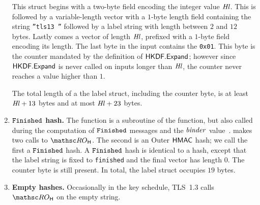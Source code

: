 \begin{enumerate}
	This struct begins with a two-byte field encoding the integer value $\mathit{Hl}$.
	This is followed by a variable-length vector with a $1$-byte length field containing the string \texttt{''tls13 ''} followed by a label string with length between $2$ and $12$ bytes. 
	Lastly comes a vector of length $\mathit{Hl}$, prefixed with a $1$-byte field encoding its length. 
	The last byte in the input contains the \texttt{0x01}. 
	This byte is the counter mandated by the definition of $\mathsf{HKDF.Expand}$; however since $\mathsf{HKDF.Expand}$ is never called on inputs longer than $\mathit{Hl}$, the counter never reaches a value higher than $1$.
	
	The total length of a the label struct, including the counter byte, is at least $\mathit{Hl}+13$ bytes and at most $\mathit{Hl}+23$ bytes. 
	
	\item \textbf{$\mathtt{Finished}$ hash.} The  function is a subroutine of the  function, but also called during the computation of $\mathtt{Finished}$ messages and the $\mathit{binder}$ value~\cite[Section 4.4.4]{rfc8446}. 
	 makes two calls to $\ROhash$. The second is an Outer $\mathsf{HMAC}$ hash; we call the first a $\mathtt{Finished}$ hash. 
	A $\mathtt{Finished}$ hash is identical to a  hash, except that the label string is fixed to \texttt{finished} and the final vector has length $0$. 
	The counter byte is still present. 
	In total, the label struct occupies $19$ bytes.

	\item \textbf{Empty hashes.} Occasionally in the key schedule, TLS~1.3 calls $\ROhash$ on the empty string. 
	

\end{enumerate}
